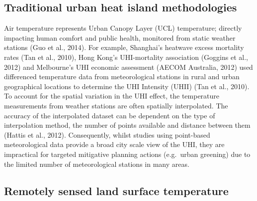 \documentclass[]{book}
\begin{document}
\subsection{Traditional urban heat island
methodologies}\label{traditional-urban-heat-island-methodologies}

Air temperature represents Urban Canopy Layer (UCL) temperature;
directly impacting human comfort and public health, monitored from
static weather stations (Guo et al., 2014). For example, Shanghai's
heatwave excess mortality rates (Tan et al., 2010), Hong Kong's
UHI-mortality association (Goggins et al., 2012) and Melbourne's UHI
economic assessment (AECOM Australia, 2012) used differenced temperature
data from meteorological stations in rural and urban geographical
locations to determine the UHI Intensity (UHII) (Tan et al., 2010). To
account for the spatial variation in the UHI effect, the temperature
measurements from weather stations are often spatially interpolated. The
accuracy of the interpolated dataset can be dependent on the type of
interpolation method, the number of points available and distance
between them (Hattis et al., 2012). Consequently, whilst studies using
point-based meteorological data provide a broad city scale view of the
UHI, they are impractical for targeted mitigative planning actions
(e.g.~urban greening) due to the limited number of meteorological
stations in many areas.

\subsection{Remotely sensed land surface
temperature}\label{remotely-sensed-land-surface-temperature}
\end{document}
